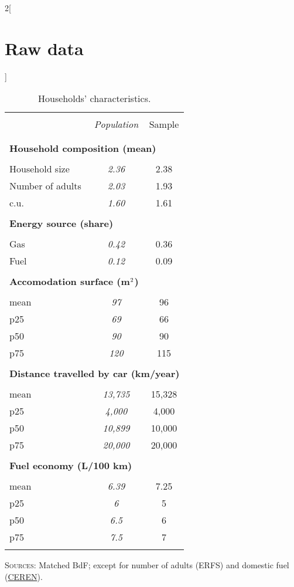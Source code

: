 \documentclass[12pt]{article} %
\begin{document}
\begin{appendices}
\begin{multicols}{2}[\section{Raw data\label{sec:Raw-Data}}]
\begin{table}[H]
    \caption{Households' characteristics.\label{tab:app-energetic-characs}}
\centering
\begin{tabular}{lcc}
\hline \hline  \\[-1.8ex]
 & \emph{Population} & Sample  \tabularnewline \\[-1.8ex]
\hline  \\[-1.8ex]
\multicolumn{3}{l}{\textbf{Household composition (mean)}} \tabularnewline  \\[-1.8ex]
Household size & \emph{2.36} & 2.38\tabularnewline
Number of adults & \emph{2.03} & 1.93\tabularnewline
c.u. & \emph{1.60} & 1.61\tabularnewline
\hline   \\[-1.8ex]
\multicolumn{3}{l}{\textbf{Energy source (share)}} \tabularnewline  \\[-1.8ex]
Gas & \emph{0.42} & 0.36\tabularnewline
Fuel & \emph{0.12} & 0.09\tabularnewline
\hline   \\[-1.8ex]
\multicolumn{3}{l}{\textbf{Accomodation surface (m$^\textnormal{2}$)}} \tabularnewline  \\[-1.8ex]
mean & \emph{97} & 96\tabularnewline
p25 & \emph{69} & 66\tabularnewline
p50 & \emph{90} & 90\tabularnewline
p75 & \emph{120} & 115\tabularnewline
\hline   \\[-1.8ex]
\multicolumn{3}{l}{\textbf{Distance travelled by car (km/year)}} \tabularnewline  \\[-1.8ex]
mean & \emph{13,735} & 15,328\tabularnewline
p25 & \emph{4,000} & 4,000\tabularnewline
p50 & \emph{10,899} & 10,000 \tabularnewline
p75 & \emph{20,000 } & 20,000 \tabularnewline
\hline   \\[-1.8ex]
\multicolumn{3}{l}{\textbf{Fuel economy (L/100 km)}} \tabularnewline  \\[-1.8ex]
mean & \emph{6.39} & 7.25\tabularnewline
p25 & \emph{6} & 5\tabularnewline
p50 & \emph{6.5} & 6\tabularnewline
p75 & \emph{7.5} & 7\tabularnewline  \\[-1.8ex]
\hline \hline 
\end{tabular}\bigskip{}

     \footnotesize{\textsc{Sources:} Matched BdF; except for number of adults (ERFS) and domestic fuel (\href{https://www.lesechos.fr/industrie-services/energie-environnement/le-chauffage-au-fioul-devient-de-plus-en-plus-cher-147372}{CEREN}).} %
\end{table}


\end{multicols}
\end{appendices}
\end{document}

